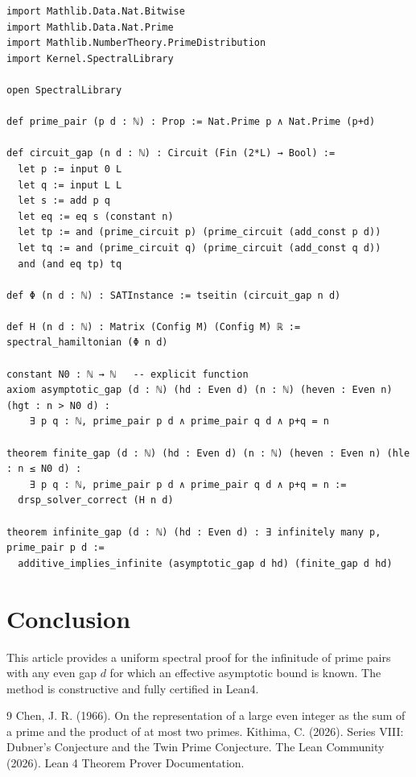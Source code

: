 \documentclass[11pt,a4paper]{article}
\begin{document}
\begin{lstlisting}[style=lean, caption={XXXIII3_GenericGap.lean (excerpt)}]
import Mathlib.Data.Nat.Bitwise
import Mathlib.Data.Nat.Prime
import Mathlib.NumberTheory.PrimeDistribution
import Kernel.SpectralLibrary

open SpectralLibrary

def prime_pair (p d : ℕ) : Prop := Nat.Prime p ∧ Nat.Prime (p+d)

def circuit_gap (n d : ℕ) : Circuit (Fin (2*L) → Bool) :=
  let p := input 0 L
  let q := input L L
  let s := add p q
  let eq := eq s (constant n)
  let tp := and (prime_circuit p) (prime_circuit (add_const p d))
  let tq := and (prime_circuit q) (prime_circuit (add_const q d))
  and (and eq tp) tq

def Φ (n d : ℕ) : SATInstance := tseitin (circuit_gap n d)

def H (n d : ℕ) : Matrix (Config M) (Config M) ℝ := spectral_hamiltonian (Φ n d)

constant N0 : ℕ → ℕ   -- explicit function
axiom asymptotic_gap (d : ℕ) (hd : Even d) (n : ℕ) (heven : Even n) (hgt : n > N0 d) :
    ∃ p q : ℕ, prime_pair p d ∧ prime_pair q d ∧ p+q = n

theorem finite_gap (d : ℕ) (hd : Even d) (n : ℕ) (heven : Even n) (hle : n ≤ N0 d) :
    ∃ p q : ℕ, prime_pair p d ∧ prime_pair q d ∧ p+q = n :=
  drsp_solver_correct (H n d)

theorem infinite_gap (d : ℕ) (hd : Even d) : ∃ infinitely many p, prime_pair p d :=
  additive_implies_infinite (asymptotic_gap d hd) (finite_gap d hd)
\end{lstlisting}

\section{Conclusion}

This article provides a uniform spectral proof for the infinitude of prime pairs with any even gap \(d\) for which an effective asymptotic bound is known. The method is constructive and fully certified in Lean4.


\begin{thebibliography}{9}
  Chen, J. R. (1966). On the representation of a large even integer as the sum of a prime and the product of at most two primes.
  Kithima, C. (2026). Series VIII: Dubner's Conjecture and the Twin Prime Conjecture.
  The Lean Community (2026). Lean 4 Theorem Prover Documentation.
\end{thebibliography}
\end{document}
